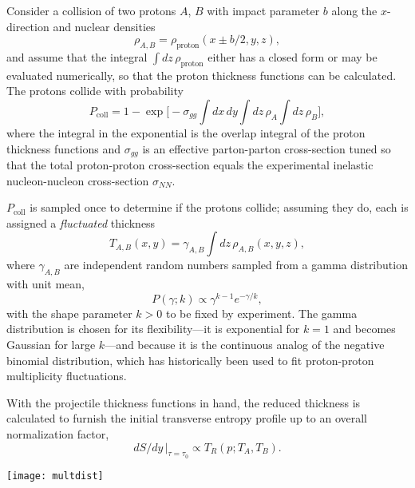 \documentclass[aps,prc,reprint,amsmath,nofootinbib]{revtex4-1}
\newcommand{\trento}{T\raisebox{-.5ex}{R}ENTo}
\begin{document}
Consider a collision of two protons $A$, $B$ with impact parameter $b$ along the $x$-direction and nuclear densities
\begin{equation}
  \rho_{A,B} = \rho_\text{proton}(x \pm b/2, y, z),
\end{equation}
and assume that the integral $\int dz \, \rho_\text{proton}$ either has a closed form or may be evaluated numerically, so that the proton thickness functions can be calculated.
The protons collide with probability \cite{dEnterria:2010hd}
\begin{equation}
  P_\text{coll} = 1 - \exp\biggl[ -\sigma_{gg} \int dx \, dy \int dz \, \rho_A \int dz \, \rho_B \biggr],
  \label{eq:pcoll}
\end{equation}
where the integral in the exponential is the overlap integral of the proton thickness functions and
$\sigma_{gg}$ is an effective parton-parton cross-section tuned so that the total proton-proton
cross-section equals the experimental inelastic nucleon-nucleon cross-section $\sigma_{NN}$.

$P_\text{coll}$ is sampled once to determine if the protons collide; assuming they do, each is assigned a \emph{fluctuated} thickness
\begin{equation}
  T_{A,B}(x, y) = \gamma_{A,B} \int dz \, \rho_{A,B}(x, y, z),
\end{equation}
where $\gamma_{A,B}$ are independent random numbers sampled from a gamma distribution with unit mean,
\begin{equation}
  P(\gamma; k) \propto \gamma^{k-1} e^{-\gamma/k},
  \label{eq:gamma}
\end{equation}
with the shape parameter $k > 0$ to be fixed by experiment.  The gamma distribution is chosen for its
flexibility---it is exponential for $k = 1$ and becomes Gaussian for large $k$---and because it is the
continuous analog of the negative binomial distribution, which has historically been used to fit proton-proton
multiplicity fluctuations.

With the projectile thickness functions in hand, the reduced thickness is calculated to furnish the initial transverse entropy profile up to an overall normalization factor,
\begin{equation}
dS/dy \, |_{\tau = \tau_0} \propto T_R(p; T_A, T_B).
\end{equation}

\begin{figure*}[t]
  \texttt{[image: multdist]}
  \caption{
    \label{fig:multdist}
    Multiplicity distributions for proton-proton, proton-lead, and lead-lead collisions.  The blue histograms
    are \protect\trento\ results from $10^6$ minimum-bias events for each collision system, all with reduced
    thickness parameter $p = 0$ (geometric mean) and gamma fluctuation parameter $k = 0.8$.  The normalization
    constants indicated in the legends are tuned to match the experimental distributions
    (points with error bars) from ALICE \cite{}.
  }
\end{figure*}
\end{document}
